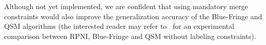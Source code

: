 
Although not yet implemented, we are confident that using mandatory merge constraints would also improve the generalization accuracy  of the Blue-Fringe and QSM algorithms (the interested reader may refer to~\cite{Dupont08} for an experimental comparison between RPNI, Blue-Fringe and QSM without labeling constraints).





